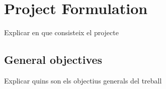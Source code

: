 \chapter{Project Formulation} %

\label{Chapter2} %

Explicar en que consisteix el projecte

\section{General objectives}

Explicar quins son els objectius generals del treball

